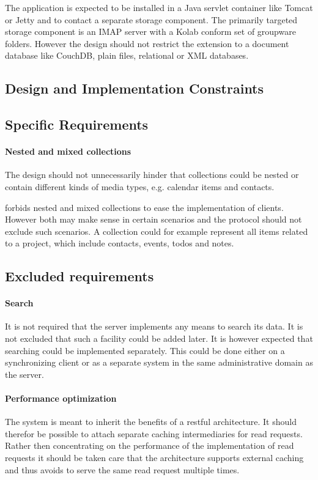 \documentclass[12pt,a4paper]{scrartcl}		%
\begin{document}
The application is expected to be installed in a Java servlet container like Tomcat or Jetty and to contact a separate storage component. The primarily targeted storage component is an IMAP server with a Kolab conform set of groupware folders. However the design should not restrict the extension to a document database like CouchDB, plain files, relational or XML databases.

\subsection{Design and Implementation Constraints}

\subsection{Specific Requirements}

\paragraph{Nested and mixed collections}
The design should not unnecessarily hinder that collections could be nested or
contain different kinds of media types, e.g. calendar items and contacts. 

\cite[sec. 5.2]{RFC6352} forbids nested and mixed collections to ease the
implementation of clients. However both may make sense in certain scenarios and
the protocol should not exclude such scenarios. A collection could for example
represent all items related to a project, which include contacts, events, todos
and notes.

\subsection{Excluded requirements}
\label{sec:excluded-requirements}
\paragraph{Search}
It is not required that the server implements any means to search its data. It
is not excluded that such a facility could be added later. It is however
expected that searching could be implemented separately. This could be done
either on a synchronizing client or as a separate system in the same
administrative domain as the server.

\paragraph{Performance optimization}
The system is meant to inherit the benefits of a restful architecture. It should
therefor be possible to attach separate caching intermediaries for read
requests. Rather then concentrating on the performance of the implementation of
read requests it should be taken care that the architecture supports external
caching and thus avoids to serve the same read request multiple times.
\end{document}
